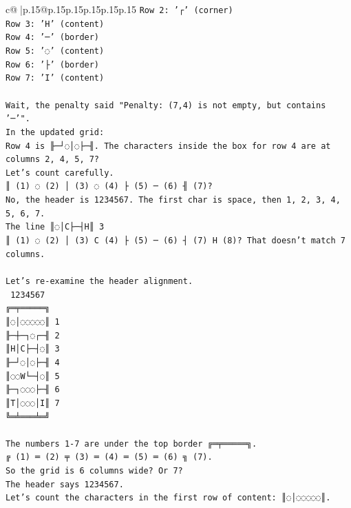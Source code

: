 \documentclass{article}
\begin{document}
{\begin{supertabular}{c@{$\;$}|p{.15\linewidth}@{}p{.15\linewidth}p{.15\linewidth}p{.15\linewidth}p{.15\linewidth}p{.15\linewidth}}
{{{\texttt{Row 2: '┌' (corner)} \\
\texttt{Row 3: 'H' (content)} \\
\texttt{Row 4: '─' (border)} \\
\texttt{Row 5: '◌' (content)} \\
\texttt{Row 6: '├' (border)} \\
\texttt{Row 7: 'I' (content)} \\
\\ 
\texttt{Wait, the penalty said "Penalty: (7,4) is not empty, but contains '─'".} \\
\texttt{In the updated grid:} \\
\texttt{Row 4 is ╟─┘◌│◌├─╢. The characters inside the box for row 4 are at columns 2, 4, 5, 7?} \\
\texttt{Let's count carefully.} \\
\texttt{║ (1) ◌ (2) │ (3) ◌ (4) ├ (5) ─ (6) ╢ (7)?} \\
\texttt{No, the header is  1234567. The first char is space, then 1, 2, 3, 4, 5, 6, 7.} \\
\texttt{The line ║◌│C├─┤H║ 3} \\
\texttt{║ (1) ◌ (2) │ (3) C (4) ├ (5) ─ (6) ┤ (7) H (8)? That doesn't match 7 columns.} \\
\\ 
\texttt{Let's re{-}examine the header alignment.} \\
\texttt{ 1234567} \\
\texttt{╔═╤═════╗} \\
\texttt{║◌│◌◌◌◌◌║ 1} \\
\texttt{╟─┼─┐◌┌─╢ 2} \\
\texttt{║H│C├─┤◌║ 3} \\
\texttt{╟─┘◌│◌├─╢ 4} \\
\texttt{║◌◌W└─┤◌║ 5} \\
\texttt{╟─┐◌◌◌├─╢ 6} \\
\texttt{║T│◌◌◌│I║ 7} \\
\texttt{╚═╧═══╧═╝} \\
\\ 
\texttt{The numbers 1{-}7 are under the top border ╔═╤═════╗.} \\
\texttt{╔ (1) ═ (2) ╤ (3) ═ (4) ═ (5) ═ (6) ╗ (7).} \\
\texttt{So the grid is 6 columns wide? Or 7?} \\
\texttt{The header says 1234567.} \\
\texttt{Let's count the characters in the first row of content: ║◌│◌◌◌◌◌║.} \\
}}}
\end{supertabular}}
\end{document}
